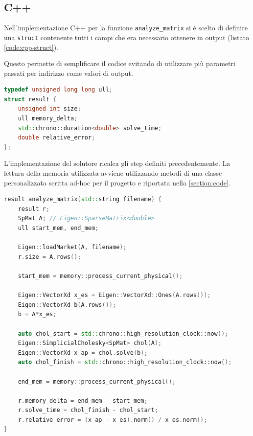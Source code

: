 \documentclass[11pt,italian]{article}
\begin{document}
\subsection{C++}
Nell'implementazione C++ per la funzione \lstinline{analyze_matrix} si è scelto di definire una \lstinline{struct} contenente tutti i campi che era necessario ottenere in output (listato \ref{code:cpp-struct}).

Questo permette di semplificare il codice evitando di utilizzare più parametri passati per indirizzo come valori di output.

\begin{lstlisting}[language=C++,emph={ull,std},caption=C++: Struct per la memorizzazione del risultato,label=code:cpp-struct]
typedef unsigned long long ull;
struct result {
    unsigned int size;
    ull memory_delta;
    std::chrono::duration<double> solve_time;
    double relative_error;
};
\end{lstlisting}

\noindent
L'implementazione del solutore ricalca gli step definiti precedentemente. La lettura della memoria utilizzata avviene utilizzando metodi di una classe personalizzata scritta ad-hoc per il progetto e riportata nella \cref{section:code}.
\begin{lstlisting}[language=C++,emph={result,SpMat,Eigen,int,std},caption=C++: Algoritmo principale,label=code:cpp-algo]
result analyze_matrix(std::string filename) {
    result r;
    SpMat A; // Eigen::SparseMatrix<double>
    ull start_mem, end_mem;

    Eigen::loadMarket(A, filename);
    r.size = A.rows();

    start_mem = memory::process_current_physical();

    Eigen::VectorXd x_es = Eigen::VectorXd::Ones(A.rows());
    Eigen::VectorXd b(A.rows());
    b = A*x_es;

    auto chol_start = std::chrono::high_resolution_clock::now();
    Eigen::SimplicialCholesky<SpMat> chol(A);
    Eigen::VectorXd x_ap = chol.solve(b);
    auto chol_finish = std::chrono::high_resolution_clock::now();

    end_mem = memory::process_current_physical();

    r.memory_delta = end_mem - start_mem;
    r.solve_time = chol_finish - chol_start;
    r.relative_error = (x_ap - x_es).norm() / x_es.norm();
}
\end{lstlisting}

\newpage
\end{document}
